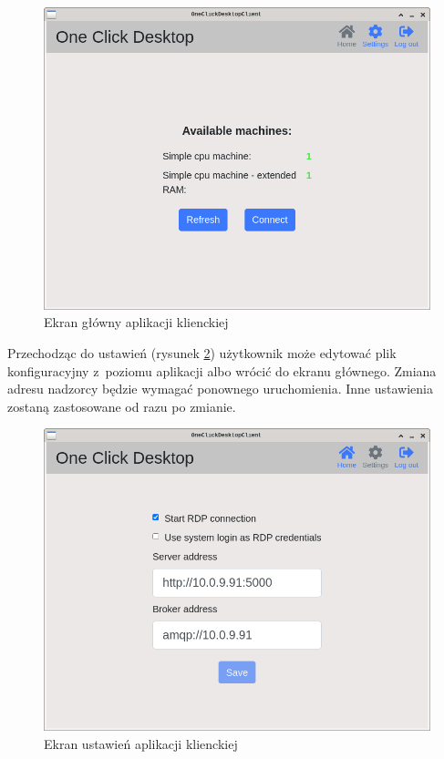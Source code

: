 \documentclass[../opis-rozwiazania.tex]{subfiles}
\begin{document}
\begin{figure}[ht!]
  \centering
  \includegraphics[width=\textwidth]{resources/client_home.png}
  \caption{Ekran główny aplikacji klienckiej}
  \label{figure:system_interaction.client.home}
\end{figure}

Przechodząc do ustawień (rysunek \ref{figure:system_interaction.client.settings}) użytkownik może edytować plik konfiguracyjny z~poziomu aplikacji albo wrócić do ekranu głównego.
Zmiana adresu nadzorcy będzie wymagać ponownego uruchomienia.
Inne ustawienia zostaną zastosowane od razu po zmianie.

\begin{figure}[ht!]
  \centering
  \includegraphics[width=\textwidth]{resources/client_settings.png}
  \caption{Ekran ustawień aplikacji klienckiej}
  \label{figure:system_interaction.client.settings}
\end{figure}
\end{document}
